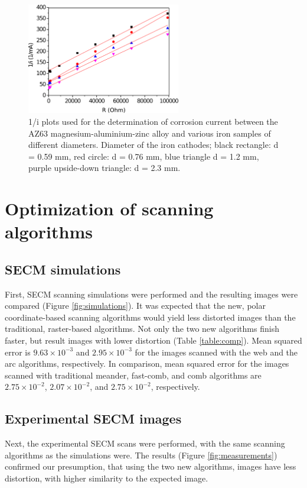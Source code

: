 \begin{figure}
\centering
\includegraphics[width=0.6\textwidth]{img/corrosion_current_measurements.eps} 
\caption[1/i plots used for the determination of corrosion current between the AZ63 magnesium-aluminium-zinc alloy and various iron samples of different diameters.]{1/i plots used for the determination of corrosion current between the AZ63 magnesium-aluminium-zinc alloy and various iron samples of different diameters.
Diameter of the iron cathodes; black rectangle: d = 0.59 mm, red circle: d = 0.76 mm, blue triangle d = 1.2 mm, purple upside-down triangle: d = 2.3 mm.}
\label{fig:corrosion_current_measurements}
\end{figure}

	\newpage
	\section{Optimization of scanning algorithms}
	\label{patterns_result}
		\subsection{SECM simulations}
First, SECM scanning simulations were performed and the resulting images were compared (Figure \ref{fig:simulations}).
It was expected that the new, polar coordinate-based scanning algorithms would yield less distorted images than the traditional, raster-based algorithms.
Not only the two new algorithms finish faster, but result images with lower distortion (Table \ref{table:comp}).
Mean squared error is $9.63\times 10^{-3}$ and $2.95\times 10^{-3}$ for the images scanned with the web and the arc algorithms, respectively.
In comparison, mean squared error for the images scanned with traditional meander, fast-comb, and comb algorithms are $2.75\times 10^{-2}$, $2.07\times 10^{-2}$, and $2.75\times 10^{-2}$, respectively.

		\subsection{Experimental SECM images}
Next, the experimental SECM scans were performed, with the same scanning algorithms as the simulations were.
The results (Figure \ref{fig:measurements}) confirmed our presumption, that using the two new algorithms, images have less distortion, with higher similarity to the expected image.

